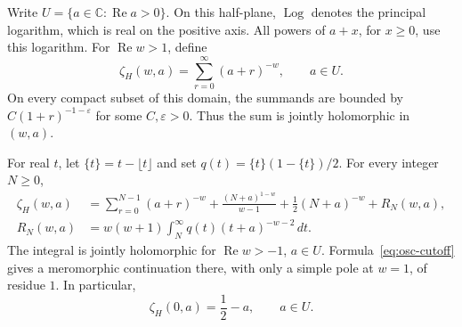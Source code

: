 Write \(U=\{a\in\mathbb C:\operatorname{Re}a>0\}\).
On this half-plane, \(\operatorname{Log}\) denotes the principal logarithm,
which is real on the positive axis. All powers of \(a+x\), for \(x\geq0\),
use this logarithm. For \(\operatorname{Re}w>1\), define
\[
 \zeta_H(w,a)=\sum_{r=0}^{\infty}(a+r)^{-w},\qquad a\in U.
\]
On every compact subset of this domain, the summands are bounded by
\(C(1+r)^{-1-\varepsilon}\) for some \(C,\varepsilon>0\).
Thus the sum is jointly holomorphic in \((w,a)\).

\begin{lemma}
\label{lem:osc-summation}
For real \(t\), let \(\{t\}=t-\lfloor t\rfloor\) and set
\(q(t)=\{t\}(1-\{t\})/2\). For every integer \(N\geq0\),
\begin{align}
 \zeta_H(w,a)
 &=\sum_{r=0}^{N-1}(a+r)^{-w}
   +\frac{(N+a)^{1-w}}{w-1}+\frac12(N+a)^{-w}
   +R_N(w,a),                                      \label{eq:osc-cutoff}\\
 R_N(w,a)
 &=w(w+1)\int_N^\infty q(t)(t+a)^{-w-2}\,dt.       \label{eq:osc-remainder}
\end{align}
The integral is jointly holomorphic for \(\operatorname{Re}w>-1\),
\(a\in U\). Formula~\eqref{eq:osc-cutoff} gives a meromorphic continuation
there, with only a simple pole at \(w=1\), of residue \(1\).
In particular,
\begin{equation}
 \zeta_H(0,a)=\frac12-a,\qquad a\in U.              \label{eq:osc-zeta-zero}
\end{equation}
\end{lemma}

